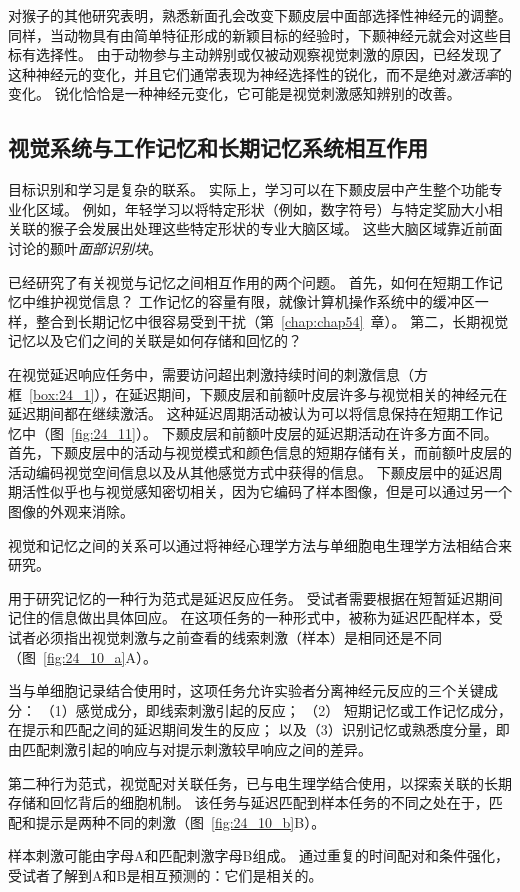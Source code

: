 对猴子的其他研究表明，熟悉新面孔会改变下颞皮层中面部选择性神经元的调整。
同样，当动物具有由简单特征形成的新颖目标的经验时，下颞神经元就会对这些目标有选择性。
由于动物参与主动辨别或仅被动观察视觉刺激的原因，已经发现了这种神经元的变化，并且它们通常表现为神经选择性的锐化，而不是绝对\textit{激活率}的变化。
锐化恰恰是一种神经元变化，它可能是视觉刺激感知辨别的改善。



\subsection{视觉系统与工作记忆和长期记忆系统相互作用}

目标识别和学习是复杂的联系。
实际上，学习可以在下颞皮层中产生整个功能专业化区域。
例如，年轻学习以将特定形状（例如，数字符号）与特定奖励大小相关联的猴子会发展出处理这些特定形状的专业大脑区域。
这些大脑区域靠近前面讨论的颞叶\textit{面部识别块}。


已经研究了有关视觉与记忆之间相互作用的两个问题。
首先，如何在短期工作记忆中维护视觉信息？
工作记忆的容量有限，就像计算机操作系统中的缓冲区一样，整合到长期记忆中很容易受到干扰（第~\ref{chap:chap54}~章）。
第二，长期视觉记忆以及它们之间的关联是如何存储和回忆的？


在视觉延迟响应任务中，需要访问超出刺激持续时间的刺激信息（方框~\ref{box:24_1}），在延迟期间，下颞皮层和前额叶皮层许多与视觉相关的神经元在延迟期间都在继续激活。
这种延迟周期活动被认为可以将信息保持在短期工作记忆中（图~\ref{fig:24_11}）。
下颞皮层和前额叶皮层的延迟期活动在许多方面不同。
首先，下颞皮层中的活动与视觉模式和颜色信息的短期存储有关，而前额叶皮层的活动编码视觉空间信息以及从其他感觉方式中获得的信息。
下颞皮层中的延迟周期活性似乎也与视觉感知密切相关，因为它编码了样本图像，但是可以通过另一个图像的外观来消除。


\begin{proposition}[视觉与工作记忆的相互作用研究] \label{box:24_1}
	
	\quad \quad 视觉和记忆之间的关系可以通过将神经心理学方法与单细胞电生理学方法相结合来研究。
	
	\quad \quad 用于研究记忆的一种行为范式是延迟反应任务。
	受试者需要根据在短暂延迟期间记住的信息做出具体回应。
	在这项任务的一种形式中，被称为延迟匹配样本，受试者必须指出视觉刺激与之前查看的线索刺激（样本）是相同还是不同（图~\ref{fig:24_10_a}A）。
	
	\quad \quad 当与单细胞记录结合使用时，这项任务允许实验者分离神经元反应的三个关键成分：
	（1）感觉成分，即线索刺激引起的反应；
	（2） 短期记忆或工作记忆成分，在提示和匹配之间的延迟期间发生的反应；
	以及（3）识别记忆或熟悉度分量，即由匹配刺激引起的响应与对提示刺激较早响应之间的差异。
	
	\quad \quad 第二种行为范式，视觉配对关联任务，已与电生理学结合使用，以探索关联的长期存储和回忆背后的细胞机制。
	该任务与延迟匹配到样本任务的不同之处在于，匹配和提示是两种不同的刺激（图~\ref{fig:24_10_b}B）。
	
	\quad \quad 样本刺激可能由字母A和匹配刺激字母B组成。
	通过重复的时间配对和条件强化，受试者了解到A和B是相互预测的：它们是相关的。
	
\end{proposition}


